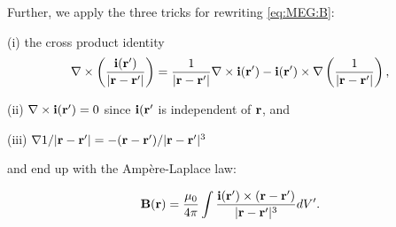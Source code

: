 {Further, we apply the three tricks for rewriting \eqref{eq:MEG:B}:

(i) the cross product identity
\begin{equation*}
{\bf \nabla} \times \left(\frac{{\bf i}({\bf r}')}{|{\bf r} - {\bf r}'|}\right) = \frac{1}{|{\bf r} - {\bf r}'|} {\bf \nabla} \times {\bf i}({\bf r}') - {\bf i}({\bf r}') \times {\bf \nabla} \left(\frac{1}{|{\bf r} - {\bf r}'|}\right),
\end{equation*}

(ii) ${\bf \nabla} \times {\bf i}({\bf r}') = 0$ since ${\bf i}({\bf r}'$ is independent of ${\bf r}$, and 

(iii) ${\bf \nabla} 1/|{\bf r} - {\bf r}'| = -({\bf r} - {\bf r}')/|{\bf r} - {\bf r}'|^3$

and end up with the Amp\`ere-Laplace law:

\begin{equation}\label{eq:MEG:ampere-laplace}
{\bf B}({\bf r}) = \frac{\mu_0}{4\pi} \int \frac{ {\bf i}({\bf r}') \times ({\bf r} - {\bf r}')}{|{\bf r} - {\bf r}'|^3} dV'.
\end{equation}
}

